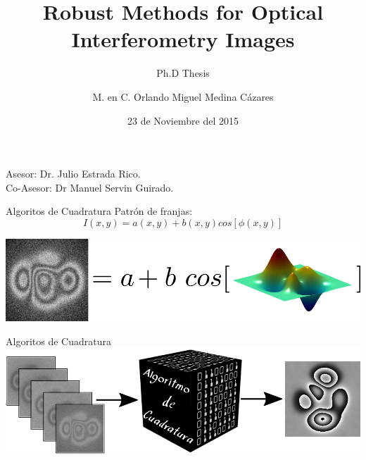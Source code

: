 \documentclass[]{beamer}
\title{Robust Methods for Optical \\ Interferometry
    Images}
\subtitle[short version]{Ph.D Thesis}
\author{M. en C. Orlando Miguel Medina C\'azares}
\date{23 de Noviembre del 2015}
\institute[CIO]{Centro de Investigaciones en \'Optica}
\begin{document}
\begin{frame}[plain]
  \maketitle
  \footnotesize{
    Asesor: Dr. Julio Estrada Rico. \\
    Co-Asesor: Dr Manuel Servin Guirado.
  }
\end{frame}
\begin{frame}{Algoritos de Cuadratura}
  Patr\'on de franjas:
  \begin{equation}
    I(x,y)=a(x,y)+b(x,y)cos[\phi(x,y)]
  \end{equation}
  \begin{center}
    \pause \includegraphics[scale=0.4]{Images/Interferogram.png}
  \end{center}
\end{frame}
\begin{frame}{Algoritos de Cuadratura}
  \includegraphics[scale=0.4]{Images/QuadratureFiltersScheme2.png}
\end{frame}
\end{document}

